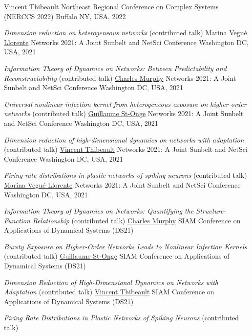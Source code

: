 \documentclass[11pt]{article}
\makeatletter
\newcommand{\reversearabic}[1]{\expandafter\@reversearabic\csname c@#1\endcsname}
\newcommand{\@reversearabic}[1]{%
  \number\numexpr\getrefnumber{this@etaremune@\romannumeral\c@etaremune}-#1+1\relax
}
\newcounter{etaremune}
\newenvironment{etaremune}[1][]{%
  \stepcounter{etaremune}%
  \begin{enumerate}[label=\reversearabic*.,#1]%
}{%
  \edef\@currentlabel{\the\csname c@\@enumctr\endcsname}%
  \label{this@etaremune@\romannumeral\c@etaremune}%
  \end{enumerate}%
}
\makeatother
\begin{document}
\begin{etaremune}[itemsep=0.5em, label={[M\reversearabic*]}, first*=\small\vspace{0.5\baselineskip}]
{  \uline{Vincent Thibeault}\split
  Northeast Regional Conference on Complex Systems (NERCCS 2022)\split
  Buffalo NY, USA, 2022}
%
  \item \parbox[t]{\textwidth-30pt}{\textit{Dimension reduction on heterogeneous networks} (contributed talk)\split
  \uline{Marina Vegué Llorente}\split
  Networks 2021: A Joint Sunbelt and NetSci Conference\split
  Washington DC, USA, 2021}
%
  \item \parbox[t]{\textwidth-30pt}{\textit{Information Theory of Dynamics on Networks: Between Predictability and Reconstructability} (contributed talk)\split
  \uline{Charles Murphy}\split
  Networks 2021: A Joint Sunbelt and NetSci Conference\split
  Washington DC, USA, 2021}
%
  \item \parbox[t]{\textwidth-30pt}{\textit{Universal nonlinear infection kernel from heterogeneous exposure on higher-order networks} (contributed talk)\split
  \uline{Guillaume St-Onge}\split
  Networks 2021: A Joint Sunbelt and NetSci Conference\split
  Washington DC, USA, 2021}
%
  \item \parbox[t]{\textwidth-30pt}{\textit{Dimension reduction of high-dimensional dynamics on networks with adaptation} (contributed talk)\split
  \uline{Vincent Thibeault}\split
  Networks 2021: A Joint Sunbelt and NetSci Conference\split
  Washington DC, USA, 2021}
%
  \item \parbox[t]{\textwidth-30pt}{\textit{Firing rate distributions in plastic networks of spiking neurons} (contributed talk)\split
  \uline{Marina Vegué Llorente}\split
  Networks 2021: A Joint Sunbelt and NetSci Conference\split
  Washington DC, USA, 2021}
%
  \item \parbox[t]{\textwidth-30pt}{\textit{Information Theory of Dynamics on Networks: Quantifying the Structure-Function Relationship} (contributed talk)\split
  \uline{Charles Murphy}\split
  SIAM Conference on Applications of Dynamical Systems (DS21)}
%
  \item \parbox[t]{\textwidth-30pt}{\textit{Bursty Exposure on Higher-Order Networks Leads to Nonlinear Infection Kernels} (contributed talk)\split
  \uline{Guillaume St-Onge}\split
  SIAM Conference on Applications of Dynamical Systems (DS21)}
%
  \item \parbox[t]{\textwidth-30pt}{\textit{Dimension Reduction of High-Dimensional Dynamics on Networks with Adaptation} (contributed talk)\split
  \uline{Vincent Thibeault}\split
  SIAM Conference on Applications of Dynamical Systems (DS21)}
%
  \item \parbox[t]{\textwidth-30pt}{\textit{Firing Rate Distributions in Plastic Networks of Spiking Neurons} (contributed talk)\split
}
\end{etaremune}
\end{document}
